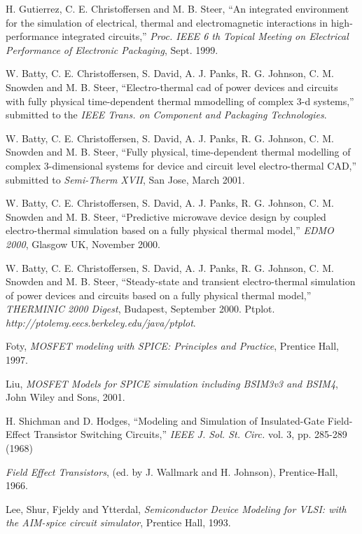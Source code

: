 \begin{thebibliography}{99}
 H. Gutierrez, C. E. Christoffersen and M. B. Steer,
``An integrated environment for the simulation of electrical, thermal
and electromagnetic interactions in high-performance integrated
circuits,'' \emph{Proc. IEEE 6 th Topical Meeting on Electrical
Performance of Electronic Packaging}, Sept. 1999.

 W. Batty, C. E. Christoffersen, S. David, A. J. Panks,
R. G. Johnson, C. M. Snowden and M. B. Steer, ``Electro-thermal cad of
power devices and circuits with fully physical time-dependent thermal
mmodelling of complex 3-d systems,'' submitted to the \emph{IEEE
Trans. on Component and Packaging Technologies}.

 W. Batty, C. E. Christoffersen, S. David, A. J. Panks,
R. G. Johnson, C. M. Snowden and M. B. Steer, ``Fully physical,
time-dependent thermal modelling of complex 3-dimensional systems for
device and circuit level electro-thermal CAD,'' submitted to
\emph{Semi-Therm XVII}, San Jose, March 2001.

 W. Batty, C. E. Christoffersen, S. David, A. J. Panks,
R. G. Johnson, C. M. Snowden and M. B. Steer, ``Predictive microwave
device design by coupled electro-thermal simulation based on a fully
physical thermal model,'' \emph{EDMO 2000}, Glasgow UK,
November 2000.

 W. Batty, C. E. Christoffersen, S. David, A. J. Panks,
R. G. Johnson, C. M. Snowden and M. B. Steer, ``Steady-state and
transient electro-thermal simulation of power devices and circuits
based on a fully physical thermal model,'' \emph{THERMINIC 2000
Digest}, Budapest, September 2000.
%
Ptplot. \emph{http://ptolemy.eecs.berkeley.edu/java/ptplot}.

Foty, \textit{MOSFET modeling with SPICE: Principles and
Practice}, Prentice Hall, 1997.

Liu, \textit{MOSFET Models for SPICE simulation including BSIM3v3
and BSIM4}, John Wiley and Sons, 2001.

H. Shichman and D. Hodges, ``Modeling and Simulation of
Insulated-Gate Field-Effect Transistor Switching Circuits,''
\textit{IEEE J. Sol. St. Circ.} vol. 3, pp. 285-289 (1968)

\textit{Field Effect Transistors}, (ed. by J. Wallmark and H.
Johnson), Prentice-Hall, 1966.

Lee, Shur, Fjeldy and Ytterdal, \textit{Semiconductor Device
Modeling for VLSI: with the AIM-spice circuit simulator}, Prentice
Hall, 1993.


\end{thebibliography}
